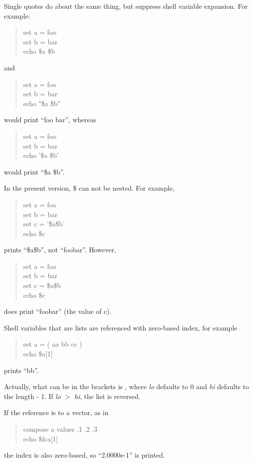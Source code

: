 Single quotes do about the same thing, but suppress shell variable
expansion.  For example:
\begin{quote}\vt
set a = foo\\
set b = bar\\
echo \$a \$b
\end{quote}
and
\begin{quote}\vt
set a = foo\\
set b = bar\\
echo "\$a \$b"
\end{quote}
would print ``{\vt foo bar}'', whereas
\begin{quote}\vt
set a = foo\\
set b = bar\\
echo '\$a \$b'
\end{quote}
would print ``{\vt \$a \$b}''.

In the present version, {\vt \$} can not be nested.  For example,
\begin{quote}\vt
set a = foo\\
set b = bar\\
set c = '\$a\$b'\\
echo \$c
\end{quote}
prints ``{\vt \$a\$b}'', not ``{\vt foobar}''.  However,
\begin{quote}\vt
set a = foo\\
set b = bar\\
set c = \$a\$b\\
echo \$c
\end{quote}
does print ``{\vt foobar}'' (the value of {\vt c}).

Shell variables that are lists are referenced with zero-based index,
for example
\begin{quote}\vt
set a = ( aa bb cc )\\
echo \$a[1]
\end{quote}
prints ``{\vt bb}''.

Actually, what can be in the brackets is {\vt [{\it lo\/}-{\it hi\/}]},
where {\it lo\/} defaults to 0 and {\it hi\/} defaults to the length - 1. 
If {\it lo\/} $>$ {\it hi\/}, the list is reversed.

If the reference is to a vector, as in
\begin{quote}\vt
compose a values .1 .2 .3\\
echo \$\&a[1]
\end{quote}
the index is also zero-based, so ``{\vt 2.0000e-1}'' is printed.

